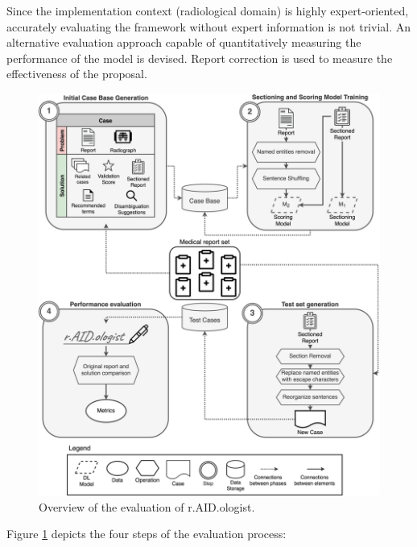 Since the implementation context (radiological domain) is highly expert-oriented, accurately evaluating the framework without expert information is not trivial. An alternative evaluation approach capable of quantitatively measuring the performance of the model is devised. Report correction is used to measure the effectiveness of the proposal.

\begin{figure}[t]
    \centering
    \includegraphics[width=.8\linewidth]{5_dlintegrationkbs/figures/raidologist_experimentation_overview.eps}
    \caption{Overview of the evaluation of r.AID.ologist.}
    \label{fig:overview_experimentation_raidologist}
\end{figure}

Figure \ref{fig:overview_experimentation_raidologist} depicts the four steps of the evaluation process:


